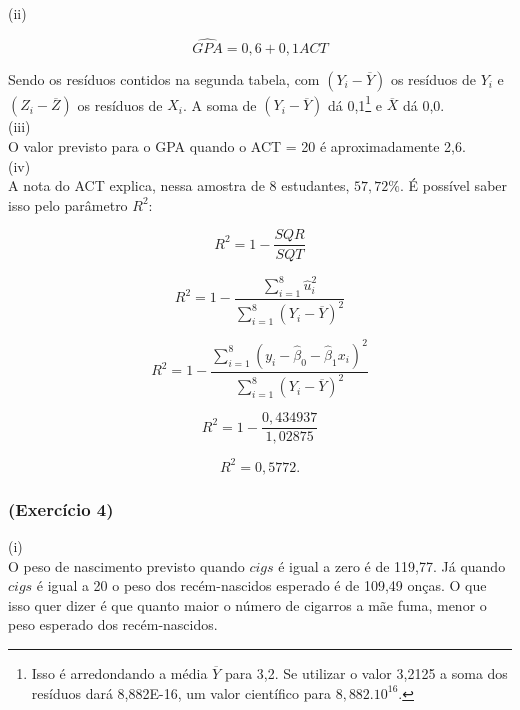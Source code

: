 \documentclass[hidelinks,11pt]{book}
\theoremstyle{definition}
\begin{document}
(ii)

\begin{displaymath}
	\widehat{GPA} = 0,6 + 0,1 ACT
\end{displaymath}

Sendo os resíduos contidos na segunda tabela, com $(Y_i - \overline{Y})$ os resíduos de $Y_i$ e $(Z_i - \overline{Z})$ os resíduos de $X_i$. A soma de $(Y_i - \overline{Y})$ dá 0,1\footnote{Isso é arredondando a média $\overline{Y}$ para 3,2. Se utilizar o valor 3,2125 a soma dos resíduos dará 8,882E-16, um valor científico para $8,882.10^{16}$.} e  $\overline{X}$ dá 0,0. \\

(iii)\\

O valor previsto para o GPA quando o ACT = 20 é aproximadamente 2,6.\\

(iv)\\

A nota do ACT explica, nessa amostra de 8 estudantes, $57,72\%$. É possível saber isso pelo parâmetro $R^2$:

\begin{displaymath}
	R^2 = 1 - \frac{SQR}{SQT}
\end{displaymath}

\begin{displaymath}
	R^2 = 1 - \frac{\sum_{i=1}^{8} \hat{u}_{i}^{2}}  {\sum_{i=1}^{8} (Y_i - \overline{Y})^2}
\end{displaymath}


\begin{displaymath}
	R^2 = 1 - \frac{\sum_{i=1}^{8} (y_i - \hat{\beta}_0 - \hat{\beta}_1 x_i)^{2}}  {\sum_{i=1}^{8} (Y_i - \overline{Y})^2}
\end{displaymath}


\begin{displaymath}
	R^2 = 1 - \frac{0,434937}  {1,02875}
\end{displaymath}

\begin{displaymath}
	R^2 = 0,5772.
\end{displaymath}

\subsubsection{(Exercício 4)}


(i)\\

O peso de nascimento previsto quando $cigs$ é igual a zero é de 119,77. Já quando $cigs$ é igual a 20 o peso dos recém-nascidos esperado é de 109,49 onças. O que isso quer dizer é que quanto maior o número de cigarros a mãe fuma, menor o peso esperado dos recém-nascidos.\\
\end{document}
